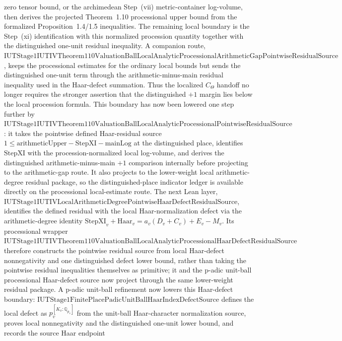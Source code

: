 \documentclass[11pt]{article}
\theoremstyle{plain}
\theoremstyle{definition}
\theoremstyle{remark}
\begin{document}
zero tensor bound, or the archimedean Step~(vii) metric-container log-volume,
then derives the projected Theorem~1.10 processional upper bound from the
formalized Proposition~1.4/1.5 inequalities.  The remaining local boundary is
the Step~(xi) identification with this normalized procession quantity together
with the distinguished one-unit residual inequality.  A companion route,
\(\mathrm{IUTStage1IUTIVTheorem110ValuationBallLocalAnalyticProcessionalArithmeticGapPointwiseResidualSource}\),
keeps the processional estimates for the ordinary local bounds but sends the
distinguished one-unit term through the arithmetic-minus-main residual inequality
used in the Haar-defect summation.  Thus the localized \(C_\Theta\) handoff no
longer requires the stronger assertion that the distinguished \(+1\) margin lies
below the local procession formula.  This boundary has now been lowered one
step further by
\(\mathrm{IUTStage1IUTIVTheorem110ValuationBallLocalAnalyticProcessionalPointwiseResidualSource}\):
it takes the pointwise defined Haar-residual source
\(1 \leq \mathrm{arithmeticUpper}-\mathrm{StepXI}-\mathrm{mainLog}\) at the
distinguished place, identifies \(\mathrm{StepXI}\) with the
procession-normalized local log-volume, and derives the distinguished
arithmetic-minus-main \(+1\) comparison internally before projecting to the
arithmetic-gap route.  It also projects to the lower-weight local
arithmetic-degree residual package, so the distinguished-place indicator
ledger is available directly on the processional local-estimate route.  The
next Lean layer,
\(\mathrm{IUTStage1IUTIVLocalArithmeticDegreePointwiseHaarDefectResidualSource}\),
identifies the defined residual with the local Haar-normalization defect via
the arithmetic-degree identity
\(\mathrm{StepXI}_v+\mathrm{Haar}_v
 = a_v(D_v+C_v)+E_v-M_v\).  Its processional wrapper
\(\mathrm{IUTStage1IUTIVTheorem110ValuationBallLocalAnalyticProcessionalHaarDefectResidualSource}\)
therefore constructs the pointwise residual source from local Haar-defect
nonnegativity and one distinguished defect lower bound, rather than taking the
pointwise residual inequalities themselves as primitive; it and the p-adic
unit-ball processional Haar-defect source now project through the same
lower-weight residual package.
A p-adic unit-ball refinement now lowers this Haar-defect boundary:
\(\mathrm{IUTStage1FinitePlacePadicUnitBallHaarIndexDefectSource}\) defines
the local defect as \(p_v^{[K_v:\mathbb{Q}_{p_v}]}\) from the unit-ball
Haar-character normalization source, proves local nonnegativity and the
distinguished one-unit lower bound, and records the source Haar endpoint
\end{document}
